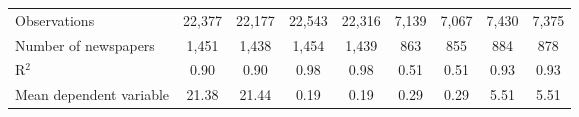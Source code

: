 {\begin{tabular}{l*{8}{c}}
\midrule
Observations        &      22,377         &      22,177         &      22,543         &      22,316         &       7,139         &       7,067         &       7,430         &       7,375         \\
Number of newspapers&       1,451         &       1,438         &       1,454         &       1,439         &         863         &         855         &         884         &         878         \\
R$^2$               &        0.90         &        0.90         &        0.98         &        0.98         &        0.51         &        0.51         &        0.93         &        0.93         \\
Mean dependent variable&       21.38         &       21.44         &        0.19         &        0.19         &        0.29         &        0.29         &        5.51         &        5.51         \\
\bottomrule
\end{tabular}
}
